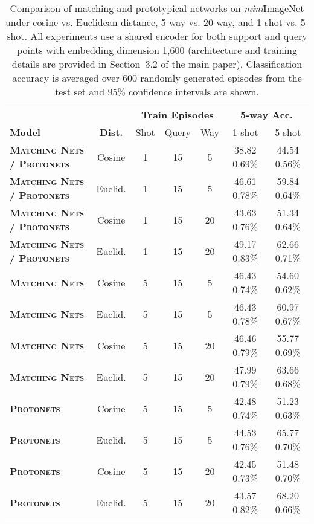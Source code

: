 \documentclass{article}
\def\abovestrut#1{\rule[0in]{0in}{#1}\ignorespaces}
\def\belowstrut#1{\rule[-#1]{0in}{#1}\ignorespaces}
\def\abovespace{\abovestrut{0.20in}}
\def\belowspace{\belowstrut{0.10in}}
\begin{document}
\begin{table*}[ht]
\caption{Comparison of matching and prototypical networks on \textit{mini}ImageNet under cosine vs. Euclidean distance, 5-way vs. 20-way, and 1-shot vs. 5-shot. All experiments use a shared 
encoder for both support and query points with embedding dimension 1,600 (architecture and training details are provided in Section~3.2 of the main paper). Classification accuracy is averaged over 600 randomly generated episodes from the test set and 95\% confidence intervals are shown.}
\label{tab:miniImagenetcompare}
\begin{center}
\begin{small}
\begin{tabular}{lcccccc}
\hline
\abovespace
&&\multicolumn{3}{c}{\textbf{Train Episodes}} & \multicolumn{2}{c}{\textbf{5-way Acc.}} \\
\belowspace
\textbf{Model} & \textbf{Dist.} & Shot & Query & Way & 1-shot & 5-shot \\
\hline
\abovespace
\textbf{\textsc{Matching Nets / Protonets}} & Cosine  & 1 & 15 & 5 & 38.82  0.69\% & 44.54  0.56\% \\
\textbf{\textsc{Matching Nets / Protonets}} & Euclid. & 1 & 15 & 5 & 46.61  0.78\% & 59.84  0.64\% \\
\textbf{\textsc{Matching Nets / Protonets}} & Cosine  & 1 & 15 & 20 & 43.63  0.76\% & 51.34  0.64\% \\
\belowspace
\textbf{\textsc{Matching Nets / Protonets}} & Euclid. & 1 & 15 & 20 & 49.17  0.83\% & 62.66  0.71\% \\

\hline

\abovespace
\textbf{\textsc{Matching Nets}} & Cosine  & 5 & 15 & 5 & 46.43  0.74\% & 54.60  0.62\% \\
\textbf{\textsc{Matching Nets}} & Euclid. & 5 & 15 & 5 & 46.43  0.78\% & 60.97  0.67\% \\
\textbf{\textsc{Matching Nets}} & Cosine  & 5 & 15 & 20 & 46.46  0.79\% & 55.77  0.69\% \\
\textbf{\textsc{Matching Nets}} & Euclid. & 5 & 15 & 20 & 47.99  0.79\% & 63.66  0.68\% \\
\textbf{\textsc{Protonets}}     & Cosine  & 5 & 15 & 5 & 42.48  0.74\% & 51.23  0.63\% \\
\textbf{\textsc{Protonets}}     & Euclid. & 5 & 15 & 5 & 44.53  0.76\% & 65.77  0.70\% \\
\textbf{\textsc{Protonets}}     & Cosine  & 5 & 15 & 20 & 42.45  0.73\% & 51.48  0.70\% \\
\belowspace
\textbf{\textsc{Protonets}}     & Euclid. & 5 & 15 & 20 & 43.57  0.82\% & 68.20  0.66\% \\
\hline
\end{tabular}
\end{small}
\end{center}
\end{table*}
\end{document}
